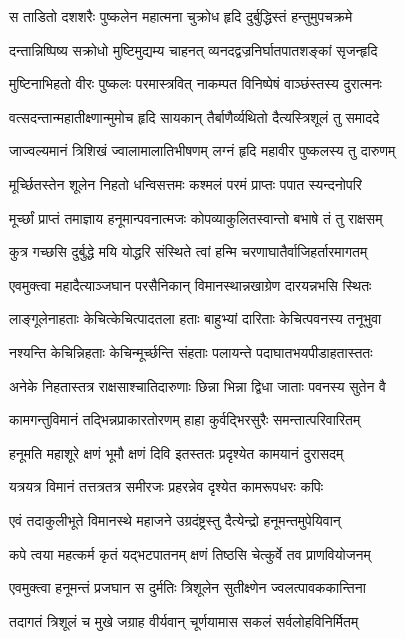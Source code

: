 \twolineshloka
{स ताडितो दशशरैः पुष्कलेन महात्मना}
{चुक्रोध हृदि दुर्बुद्धिस्तं हन्तुमुपचक्रमे}%

\twolineshloka
{दन्तान्निष्पिष्य सक्रोधो मुष्टिमुद्यम्य चाहनत्}
{व्यनदद्वज्रनिर्घातपातशङ्कां सृजन्हृदि}%

\twolineshloka
{मुष्टिनाभिहतो वीरः पुष्कलः परमास्त्रवित्}
{नाकम्पत विनिष्पेषं वाञ्छंस्तस्य दुरात्मनः}%

\twolineshloka
{वत्सदन्तान्महातीक्ष्णान्मुमोच हृदि सायकान्}
{तैर्बाणैर्व्यथितो दैत्यस्त्रिशूलं तु समाददे}%

\twolineshloka
{जाज्वल्यमानं त्रिशिखं ज्वालामालातिभीषणम्}
{लग्नं हृदि महावीर पुष्कलस्य तु दारुणम्}%

\twolineshloka
{मूर्च्छितस्तेन शूलेन निहतो धन्विसत्तमः}
{कश्मलं परमं प्राप्तः पपात स्यन्दनोपरि}%

\twolineshloka
{मूर्च्छां प्राप्तं तमाज्ञाय हनूमान्पवनात्मजः}
{कोपव्याकुलितस्वान्तो बभाषे तं तु राक्षसम्}%

\twolineshloka
{कुत्र गच्छसि दुर्बुद्धे मयि योद्धरि संस्थिते}
{त्वां हन्मि चरणाघातैर्वाजिहर्तारमागतम्}%

\twolineshloka
{एवमुक्त्वा महादैत्याञ्जघान परसैनिकान्}
{विमानस्थान्नखाग्रेण दारयन्नभसि स्थितः}%

\twolineshloka
{लाङ्गूलेनाहताः केचित्केचित्पादतला हताः}
{बाहुभ्यां दारिताः केचित्पवनस्य तनूभुवा}%

\twolineshloka
{नश्यन्ति केचिन्निहताः केचिन्मूर्च्छन्ति संहताः}
{पलायन्ते पदाघातभयपीडाहतास्ततः}%

\twolineshloka
{अनेके निहतास्तत्र राक्षसाश्चातिदारुणाः}
{छिन्ना भिन्ना द्विधा जाताः पवनस्य सुतेन वै}%

\twolineshloka
{कामगन्तुविमानं तद्भिन्नप्राकारतोरणम्}
{हाहा कुर्वद्भिरसुरैः समन्तात्परिवारितम्}%

\twolineshloka
{हनूमति महाशूरे क्षणं भूमौ क्षणं दिवि}
{इतस्ततः प्रदृश्येत कामयानं दुरासदम्}%

\twolineshloka
{यत्रयत्र विमानं तत्तत्रतत्र समीरजः}
{प्रहरन्नेव दृश्येत कामरूपधरः कपिः}%

\twolineshloka
{एवं तदाकुलीभूते विमानस्थे महाजने}
{उग्रदंष्ट्रस्तु दैत्येन्द्रो हनूमन्तमुपेयिवान्}%

\twolineshloka
{कपे त्वया महत्कर्म कृतं यद्भटपातनम्}
{क्षणं तिष्ठसि चेत्कुर्वे तव प्राणवियोजनम्}%

\twolineshloka
{एवमुक्त्वा हनूमन्तं प्रजघान स दुर्मतिः}
{त्रिशूलेन सुतीक्ष्णेन ज्वलत्पावककान्तिना}%

\twolineshloka
{तदागतं त्रिशूलं च मुखे जग्राह वीर्यवान्}
{चूर्णयामास सकलं सर्वलोहविनिर्मितम्}%

